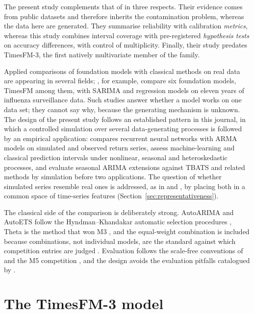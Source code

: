 \documentclass[11pt]{article}
\providecommand{\sectionref}[1]{Section~\ref{#1}}
\begin{document}
The present study complements that of \citet{adler2026calibrated} in three respects. Their
evidence comes from public datasets and therefore inherits the contamination problem, whereas the
data here are generated. They summarise reliability with calibration \emph{metrics}, whereas this
study combines interval coverage with pre-registered \emph{hypothesis tests} on accuracy
differences, with control of multiplicity. Finally, their study predates TimesFM-3, the first
natively multivariate member of the family.

Applied comparisons of foundation models with classical methods on real data are appearing in
several fields; \citet{chu2026influenza}, for example, compare six foundation models, TimesFM
among them, with SARIMA and regression models on eleven years of influenza surveillance data.
Such studies answer whether a model works on one data set; they cannot say why, because the
generating mechanism is unknown. The design of the present study follows an established pattern
in this journal, in which a controlled simulation over several data-generating processes is
followed by an empirical application: \citet{berger2025deep} compares recurrent neural networks
with ARMA models on simulated and observed return series, \citet{chu2026intervals} assess
machine-learning and classical prediction intervals under nonlinear, seasonal and heteroskedastic
processes, and \citet{lisi2025multiple} evaluate seasonal ARIMA extensions against TBATS and
related methods by simulation before two applications. The question of whether simulated series
resemble real ones is addressed, as in \citet{kang2017instance} and \citet{talagala2023metalearning},
by placing both in a common space of time-series features (\sectionref{sec:representativeness}).

The classical side of the comparison is deliberately strong. AutoARIMA and AutoETS follow the
Hyndman--Khandakar automatic selection procedures \citep{hyndman2008forecast,
hyndman2002statespace}, Theta is the method that won M3 \citep{assimakopoulos2000theta}, and
the equal-weight combination is included because combinations, not individual models, are the
standard against which competition entries are judged \citep{makridakis2020m4}. Evaluation
follows the scale-free conventions of \citet{hyndman2006mase} and the M5 competition
\citep{makridakis2022m5, makridakis2022m5unc}, and the design avoids the
evaluation pitfalls catalogued by \citet{hewamalage2023evaluation}.

\section{The TimesFM-3 model}
\label{sec:timesfm}
\end{document}

